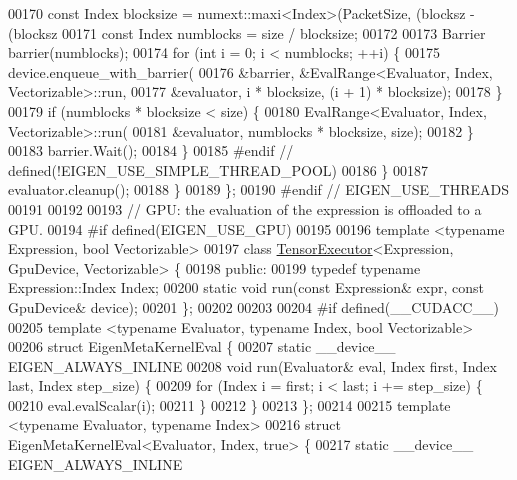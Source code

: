 \begin{DoxyCode}
{00170         \textcolor{keyword}{const} Index blocksize = numext::maxi<Index>(PacketSize, (blocksz - (blocksz %
00171         \textcolor{keyword}{const} Index numblocks = size / blocksize;
00172 
00173         Barrier barrier(numblocks);
00174         \textcolor{keywordflow}{for} (\textcolor{keywordtype}{int} i = 0; i < numblocks; ++i) \{
00175           device.enqueue\_with\_barrier(
00176               &barrier, &EvalRange<Evaluator, Index, Vectorizable>::run,
00177               &evaluator, i * blocksize, (i + 1) * blocksize);
00178         \}
00179         \textcolor{keywordflow}{if} (numblocks * blocksize < size) \{
00180           EvalRange<Evaluator, Index, Vectorizable>::run(
00181               &evaluator, numblocks * blocksize, size);
00182         \}
00183         barrier.Wait();
00184       \}
00185 \textcolor{preprocessor}{#endif  // defined(!EIGEN\_USE\_SIMPLE\_THREAD\_POOL)}
00186     \}
00187     evaluator.cleanup();
00188   \}
00189 \};
00190 \textcolor{preprocessor}{#endif  // EIGEN\_USE\_THREADS}
00191 
00192 
00193 \textcolor{comment}{// GPU: the evaluation of the expression is offloaded to a GPU.}
00194 \textcolor{preprocessor}{#if defined(EIGEN\_USE\_GPU)}
00195 
00196 \textcolor{keyword}{template} <\textcolor{keyword}{typename} Expression, \textcolor{keywordtype}{bool} Vectorizable>
00197 \textcolor{keyword}{class }\hyperlink{class_tensor_executor}{TensorExecutor}<Expression, GpuDevice, Vectorizable> \{
00198  \textcolor{keyword}{public}:
00199   \textcolor{keyword}{typedef} \textcolor{keyword}{typename} Expression::Index Index;
00200   \textcolor{keyword}{static} \textcolor{keywordtype}{void} run(\textcolor{keyword}{const} Expression& expr, \textcolor{keyword}{const} GpuDevice& device);
00201 \};
00202 
00203 
00204 \textcolor{preprocessor}{#if defined(\_\_CUDACC\_\_)}
00205 \textcolor{keyword}{template} <\textcolor{keyword}{typename} Evaluator, \textcolor{keyword}{typename} Index, \textcolor{keywordtype}{bool} Vectorizable>
00206 \textcolor{keyword}{struct }EigenMetaKernelEval \{
00207   \textcolor{keyword}{static} \_\_device\_\_ EIGEN\_ALWAYS\_INLINE
00208   \textcolor{keywordtype}{void} run(Evaluator& eval, Index first, Index last, Index step\_size) \{
00209     \textcolor{keywordflow}{for} (Index i = first; i < last; i += step\_size) \{
00210       eval.evalScalar(i);
00211     \}
00212   \}
00213 \};
00214 
00215 \textcolor{keyword}{template} <\textcolor{keyword}{typename} Evaluator, \textcolor{keyword}{typename} Index>
00216 \textcolor{keyword}{struct }EigenMetaKernelEval<Evaluator, Index, true> \{
00217   \textcolor{keyword}{static} \_\_device\_\_ EIGEN\_ALWAYS\_INLINE
}
\end{DoxyCode}
